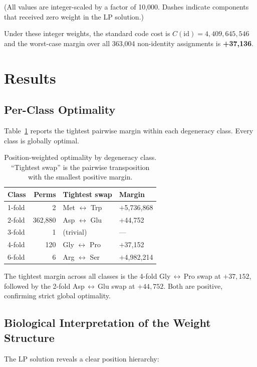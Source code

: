 \documentclass[11pt,twocolumn]{article}
\begin{document}
(All values are integer-scaled by a factor of 10,000. Dashes indicate
components that received zero weight in the LP solution.)

Under these integer weights, the standard code cost is
$C(\text{id}) = 4{,}409{,}645{,}546$ and the worst-case margin over all
363,004 non-identity assignments is \textbf{+37,136}.

\section{Results}

\subsection{Per-Class Optimality}

Table~\ref{tab:classes} reports the tightest pairwise margin within each
degeneracy class. Every class is globally optimal.

\begin{table}[t]
\centering
\caption{Position-weighted optimality by degeneracy class. ``Tightest
swap'' is the pairwise transposition with the smallest positive margin.}
\label{tab:classes}
\small
\begin{tabular}{@{}lrll@{}}
\toprule
Class & Perms & Tightest swap & Margin \\
\midrule
1-fold & 2 & Met $\leftrightarrow$ Trp & $+$5,736,868 \\
2-fold & 362,880 & Asp $\leftrightarrow$ Glu & $+$44,752 \\
3-fold & 1 & (trivial) & --- \\
4-fold & 120 & Gly $\leftrightarrow$ Pro & $+$37,152 \\
6-fold & 6 & Arg $\leftrightarrow$ Ser & $+$4,982,214 \\
\bottomrule
\end{tabular}
\end{table}

The tightest margin across all classes is the 4-fold
Gly\,$\leftrightarrow$\,Pro swap at $+37{,}152$, followed by the 2-fold
Asp\,$\leftrightarrow$\,Glu swap at $+44{,}752$. Both are positive,
confirming strict global optimality.

\subsection{Biological Interpretation of the Weight Structure}

The LP solution reveals a clear position hierarchy:
\end{document}
